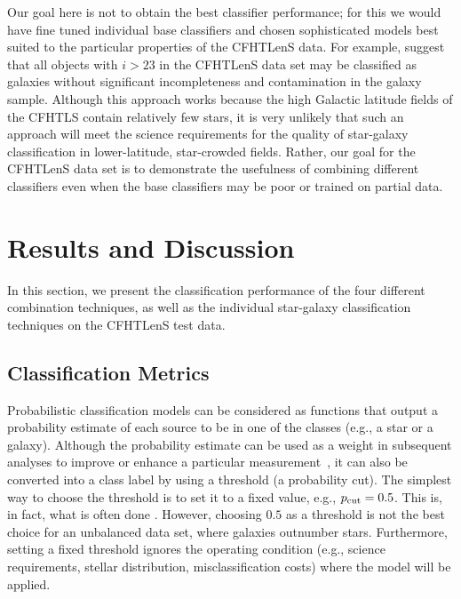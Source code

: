 \documentclass[useAMS,usenatbib]{mn2e}
\newcommand{\eg}{{e.g., }}
\begin{document}
Our goal here is not to obtain the best classifier
performance; for this we would have fine tuned individual base
classifiers and chosen sophisticated models best suited to the
particular properties of the CFHTLenS data.
For example, \cite{hildebrandt2012cfhtlens} suggest that
all objects with $i > 23$ in the CFHTLenS data set
may be classified as galaxies
without significant incompleteness and contamination in the galaxy sample.
Although this approach works because
the high Galactic latitude fields of the CFHTLS contain
relatively few stars,
it is very unlikely that such an approach
will meet the science requirements for the quality of
star-galaxy classification in lower-latitude, star-crowded fields.
Rather, our goal for the CFHTLenS data set
is to demonstrate the usefulness
of combining different classifiers even when
the base classifiers may be poor or trained on partial data.

\section{Results and Discussion}
  \label{section:results_and_discussion}

In this section, we present the classification performance of
the four different combination techniques,
as well as the individual star-galaxy classification techniques
on the CFHTLenS test data.


\subsection{Classification Metrics}

Probabilistic classification models can be considered as
functions that output a probability estimate of each source
to be in one of the classes (\eg a star or a galaxy).
Although the probability estimate can be used as a weight 
in subsequent analyses to improve or enhance
a particular measurement~\citep{ross2011ameliorating},
it can also be converted into a class label
by using a threshold (a probability cut).
The simplest way to choose the threshold is to set it to a fixed value,
\eg $p_{\mathrm{cut}} = 0.5$.
This is, in fact, what is often done
\citep[\eg][]{henrion2011bayesian, Fadely2012}.
However, choosing $0.5$ as a threshold is not the best choice
for an unbalanced data set, where galaxies outnumber stars.
Furthermore, setting a fixed threshold ignores the operating condition 
(\eg science requirements, stellar distribution, misclassification costs)
where the model will be applied.
\end{document}
